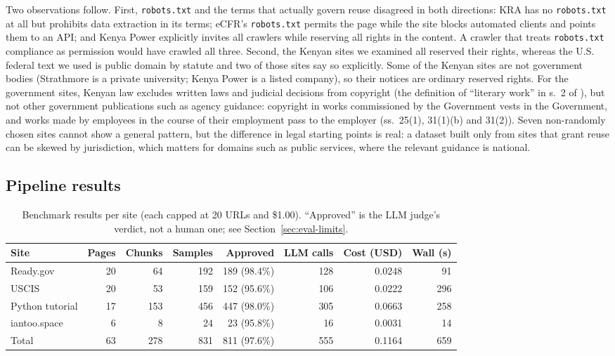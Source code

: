\documentclass[11pt]{article}
\begin{document}
Two observations follow. First, \texttt{robots.txt} and the terms that
actually govern reuse disagreed in both directions: KRA has no
\texttt{robots.txt} at all but prohibits data extraction in its terms;
eCFR's \texttt{robots.txt} permits the page while the site blocks
automated clients and points them to an API; and Kenya Power explicitly
invites all crawlers while reserving all rights in the content. A crawler
that treats \texttt{robots.txt} compliance as permission would have
crawled all three. Second, the Kenyan sites we examined all reserved their
rights, whereas the U.S. federal text we used is public domain by statute
\cite{usc17sec105} and two of those sites say so explicitly. Some of the
Kenyan sites are not government bodies (Strathmore is a private
university; Kenya Power is a listed company), so their notices are
ordinary reserved rights. For the government sites, Kenyan law excludes
written laws and judicial decisions from copyright (the definition of
``literary work'' in s.~2 of \cite{kenyacopyright2001}), but not other
government publications such as agency guidance: copyright in works
commissioned by the Government vests in the Government, and works made by
employees in the course of their employment pass to the employer
(ss.~25(1), 31(1)(b) and 31(2)). Seven non-randomly chosen sites cannot
show a general pattern, but the difference in legal starting points is
real: a dataset built only from sites that grant reuse can be skewed by
jurisdiction, which matters for domains such as public services, where
the relevant guidance is national.

\subsection{Pipeline results}
\label{sec:eval-results}

\begin{table}[h]
  \centering
  \small
  \caption{Benchmark results per site (each capped at 20 URLs and
  \$1.00). ``Approved'' is the LLM judge's verdict, not a human one; see
  Section~\ref{sec:eval-limits}.}
  \label{tab:bench}
  \begin{tabular}{@{}l r r r r r r r@{}}
    \toprule
    Site & Pages & Chunks & Samples & Approved & LLM calls & Cost (USD) & Wall (s) \\
    \midrule
    Ready.gov       & 20 &  64 & 192 & 189 (98.4\%) & 128 & 0.0248 &  91 \\
    USCIS           & 20 &  53 & 159 & 152 (95.6\%) & 106 & 0.0222 & 296 \\
    Python tutorial & 17 & 153 & 456 & 447 (98.0\%) & 305 & 0.0663 & 258 \\
    iantoo.space    &  6 &   8 &  24 &  23 (95.8\%) &  16 & 0.0031 &  14 \\
    \midrule
    Total           & 63 & 278 & 831 & 811 (97.6\%) & 555 & 0.1164 & 659 \\
    \bottomrule
  \end{tabular}
\end{table}
\end{document}
